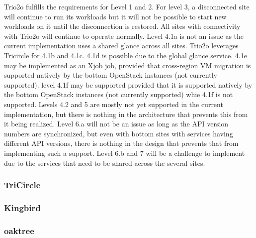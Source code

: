 Trio2o fulfills the requirements for Level 1 and 2. For level 3, a disconnected site will continue to run its workloads but it will not be possible to start new workloads on it until the disconnection is restored. All sites with connectivity with Trio2o will continue to operate normally. Level 4.1a is not an issue as the current implementation uses a shared glance across all sites. Trio2o leverages Tricircle for 4.1b and 4.1c. 4.1d is possible due to the global glance service. 4.1e may be implemented as an Xjob job, provided that cross-region VM migration is supported natively by the bottom OpenStack instances (not currently supported). level 4.1f may be supported provided that it is supported natively by the bottom OpenStack instances (not currently supported) whie 4.1f is not supported. Levels 4.2  and 5 are mostly not yet supported in the current implementation, but there is nothing in the architecture that prevents this from it being realized. Level 6.a will not be an issue as long as the API version numbers are synchronized, but even with bottom sites with services having different API versions, there is nothing in the design that prevents that from implementing such a support. Level 6.b and 7 will be a challenge to implement due to the services that need to be shared across the several sites.  
\subsubsection{TriCircle}
\subsubsection{Kingbird}
\subsubsection{oaktree}

